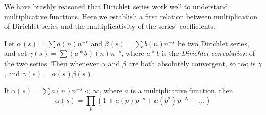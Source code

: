 We have brashly reasoned that Dirichlet series work well to understand multiplicative functions. Here we establish a first relation between multiplication of Dirichlet series and the multiplicativity of the series' coefficients.

\begin{theorem}
    Let $\alpha(s) = \sum a(n) n^{-s}$ and $\beta(s) = \sum b(n) n^{-s}$ be two Dirichlet series, and set $\gamma(s) = \sum (a * b)(n) n^{-s}$, where $a * b$ is the {\it Dirichlet convolution} of the two series. Then whenever $\alpha$ and $\beta$ are both absolutely convergent, so too is $\gamma$, and $\gamma(s) = \alpha(s) \beta(s)$.
\end{theorem}
\begin{solution}
    
\end{solution}

\begin{theorem}
    If $\alpha(s) = \sum a(n) n^{-s} < \infty$, where $a$ is a multiplicative function, then
    \[ \alpha(s) = \prod_p \left( 1 + a(p) p^{-s} + a(p^2) p^{-2s} + \dots \right) \]
\end{theorem}



